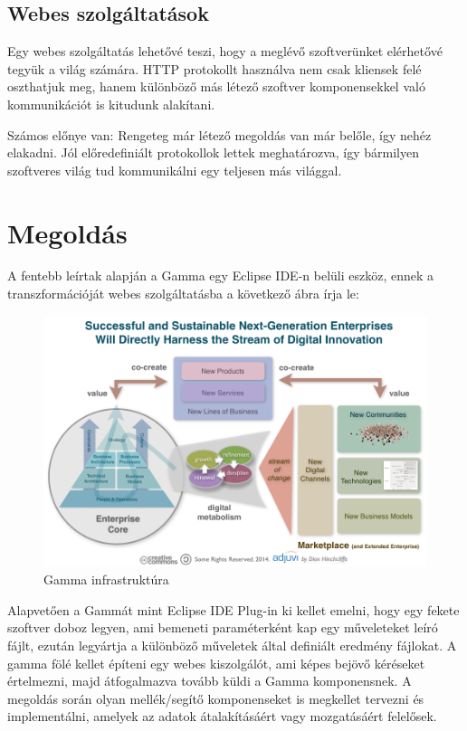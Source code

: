 \subsection{Webes szolgáltatások}

Egy webes szolgáltatás lehetővé teszi, hogy a meglévő szoftverünket elérhetővé tegyük a világ számára. HTTP protokollt használva nem csak kliensek felé oszthatjuk meg, hanem különböző más létező szoftver komponensekkel való kommunikációt is kitudunk alakítani.

Számos előnye van: Rengeteg már létező megoldás van már belőle, így nehéz elakadni. Jól előredefiniált protokollok lettek meghatározva, így bármilyen szoftveres világ tud kommunikálni egy teljesen más világgal.

\section{Megoldás}
A fentebb leírtak alapján a Gamma egy Eclipse IDE-n belüli eszköz, ennek a transzformációját webes szolgáltatásba a következő ábra írja le:

\begin{figure}[!ht]
	\centering
	\includegraphics[width=150mm, keepaspectratio]{figures/place_holder1.png}
	\caption{Gamma infrastruktúra}
	\label{fig:TeXstudio}
\end{figure}


Alapvetően a Gammát mint Eclipse IDE Plug-in ki kellet emelni, hogy egy fekete szoftver doboz legyen, ami bemeneti paraméterként kap egy műveleteket leíró fájlt, ezután legyártja a különböző műveletek által definiált eredmény fájlokat. A gamma fölé kellet építeni egy webes kiszolgálót, ami képes bejövő kéréseket értelmezni, majd átfogalmazva tovább küldi a Gamma komponensnek. A megoldás során olyan mellék/segítő komponenseket is megkellet tervezni és implementálni, amelyek az adatok átalakításáért vagy mozgatásáért felelősek.
